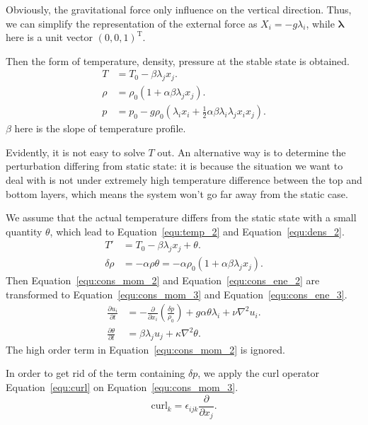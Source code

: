 Obviously, the gravitational force only influence on the vertical direction. Thus, we can simplify the representation of the external force as \(X_i=-g\lambda_i\), while \(\boldsymbol{\lambda}\) here is a unit vector \(\left( 0,0,1 \right)^\mathrm{T}\).\par
Then the form of temperature, density, pressure at the stable state is obtained.
\begin{align}
T&=T_0-\beta\lambda_j x_j. \label{equ:temp_1} \\
\rho&=\rho_0\left(1+\alpha\beta\lambda_j x_j\right). \label{equ:dens_1}\\
p&=p_0-g\rho_0\left( \lambda_i x_i + \frac{1}{2}\alpha\beta\lambda_i\lambda_j x_i x_j \right). \label{equ:pres_1}
\end{align}
\(\beta\) here is the slope of temperature profile.\par
Evidently, it is not easy to solve \(T\) out. An alternative way is to determine the perturbation differing from static state: it is because the situation we want to deal with is not under extremely high temperature difference between the top and bottom layers, which means the system won't go far away from the static case. \par
We assume that the actual temperature differs from the static state with a small quantity \(\theta\), which lead to Equation~\ref{equ:temp_2} and Equation~\ref{equ:dens_2}. 
\begin{align}
T'&=T_0-\beta\lambda_j x_j+\theta. \label{equ:temp_2} \\
\delta\rho&=-\alpha\rho\theta=-\alpha\rho_0\left( 1+\alpha\beta\lambda_j x_j \right). \label{equ:dens_2}
\end{align}
Then Equation~\ref{equ:cons_mom_2} and Equation~\ref{equ:cons_ene_2} are transformed to Equation~\ref{equ:cons_mom_3} and Equation~\ref{equ:cons_ene_3}.
\begin{align}
\frac{\partial u_i}{\partial t}&=-\frac{\partial}{\partial x_i}\left( \frac{\delta p}{\rho_0} \right)+g\alpha\theta\lambda_i+\nu\nabla^2 u_i. \label{equ:cons_mom_3}\\
\frac{\partial \theta}{\partial t}&=\beta\lambda_j u_j+\kappa\nabla^2\theta. \label{equ:cons_ene_3}
\end{align}
The high order term in Equation~\ref{equ:cons_mom_2} is ignored.\par
In order to get rid of the term containing \(\delta p\), we apply the curl operator Equation~\ref{equ:curl} on Equation~\ref{equ:cons_mom_3}. 
\begin{equation}
\mathrm{curl}_k=\epsilon_{ijk}\frac{\partial}{\partial x_j}.
\label{equ:curl}
\end{equation}

